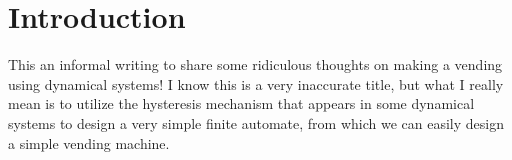 \documentclass[12pt]{article}
\begin{document}
 
  
  \vspace{-1.8cm}


\newpage

\section{Introduction}
This an informal writing to share some ridiculous thoughts on making a vending using dynamical systems! I know this is a very inaccurate title, but what I really mean is to utilize the hysteresis mechanism that appears in some dynamical systems to design a very simple finite automate, from which we can easily design a simple vending machine.   
\end{document}
